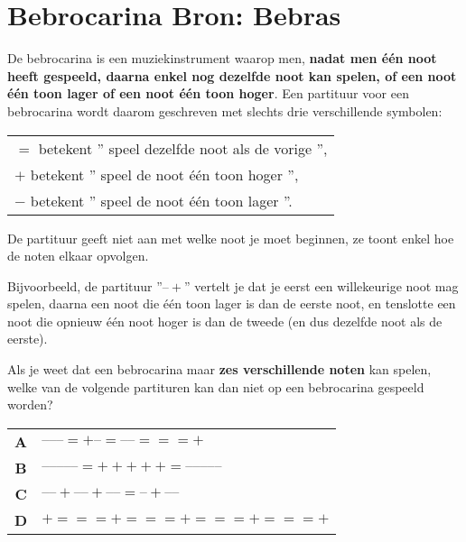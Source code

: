 \documentclass[12pt, a4paper]{article}
\begin{document}
	\begin{minipage}{\textwidth}
		\section{Bebrocarina \hfill\small Bron: Bebras}
			
			De bebrocarina is een muziekinstrument waarop men, \textbf{nadat men één noot heeft gespeeld, daarna enkel nog dezelfde noot kan spelen, of een noot één toon lager of een noot één toon hoger}. Een partituur voor een bebrocarina wordt daarom geschreven met slechts drie verschillende symbolen:
			
			\begin{table}[H]
				\setlength\parindent{24pt}
				\begin{tabular}{l}
					$=$ betekent '' speel dezelfde noot als de vorige '', \\
					$+$ betekent '' speel de noot één toon hoger '', \\
					$-$ betekent '' speel de noot één toon lager ''.
				\end{tabular}
			\end{table}
			
			De partituur geeft niet aan met welke noot je moet beginnen, ze toont enkel hoe de noten elkaar opvolgen.
			
			Bijvoorbeeld, de partituur ''$ – + $'' vertelt je dat je eerst een willekeurige noot mag spelen, daarna een noot die één toon lager is dan de eerste noot, en tenslotte een noot die opnieuw één noot hoger is dan de tweede (en dus dezelfde noot als de eerste).
			
			Als je weet dat een bebrocarina maar \textbf{zes verschillende noten} kan spelen, welke van de volgende partituren kan dan niet op een bebrocarina gespeeld worden?
			
			\begin{table}[H]
				\centering
				\begin{tabular}{|c l|}
					\hline
					\textbf{A} & $– – – = + – = – – = = = +$ \\ 
					\textbf{B} & $– – – – – = + + + + + = – – – – –$ \\  
					\textbf{C} & $– – + – – + – – = – + – –$ \\ 
					\textbf{D} & $+ = = = + = = = + = = = + = = = +$ \\ 
					\hline
				\end{tabular}
			\end{table}
	\end{minipage} \\ \\
	
\end{document}
